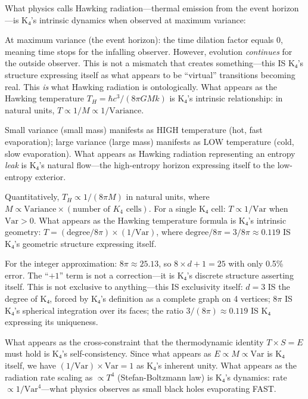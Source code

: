 \documentclass[11pt,a4paper]{book}
\begin{document}
What physics calls Hawking radiation—thermal emission from the event horizon—is K₄'s intrinsic dynamics when observed at maximum variance:

At maximum variance (the event horizon): the time dilation factor equals 0, meaning time stops for the infalling observer. However, evolution \emph{continues} for the outside observer. This is not a mismatch that creates something—this IS K₄'s structure expressing itself as what appears to be ``virtual'' transitions becoming real. This \emph{is} what Hawking radiation is ontologically. What appears as the Hawking temperature $T_H = \hbar c^3 / (8\pi G M k)$ is K₄'s intrinsic relationship: in natural units, $T \propto 1/M \propto 1/\text{Variance}$.

Small variance (small mass) manifests as HIGH temperature (hot, fast evaporation); large variance (large mass) manifests as LOW temperature (cold, slow evaporation). What appears as Hawking radiation representing an entropy \emph{leak} is K₄'s natural flow—the high-entropy horizon expressing itself to the low-entropy exterior.

Quantitatively, $T_H \propto 1/(8\pi M)$ in natural units, where $M \propto \text{Variance} \times (\text{number of } K_4 \text{ cells})$. For a single K₄ cell: $T \propto 1/\text{Var}$ when $\text{Var} > 0$. What appears as the Hawking temperature formula is K₄'s intrinsic geometry: $T = (\text{degree}/8\pi) \times (1/\text{Var})$, where $\text{degree}/8\pi = 3/8\pi \approx 0.119$ IS K₄'s geometric structure expressing itself.

For the integer approximation: $8\pi \approx 25.13$, so $8 \times d + 1 = 25$ with only 0.5\% error. The ``$+1$'' term is not a correction—it is K₄'s discrete structure asserting itself. This is not exclusive to anything—this IS exclusivity itself: $d = 3$ IS the degree of K₄, forced by K₄'s definition as a complete graph on 4 vertices; $8\pi$ IS K₄'s spherical integration over its faces; the ratio $3/(8\pi) \approx 0.119$ IS K₄ expressing its uniqueness.

What appears as the cross-constraint that the thermodynamic identity $T \times S = E$ must hold is K₄'s self-consistency. Since what appears as $E \propto M \propto \text{Var}$ is K₄ itself, we have $(1/\text{Var}) \times \text{Var} = 1$ as K₄'s inherent unity. What appears as the radiation rate scaling as $\propto T^4$ (Stefan-Boltzmann law) is K₄'s dynamics: rate $\propto 1/\text{Var}^4$—what physics observes as small black holes evaporating FAST.
\end{document}
